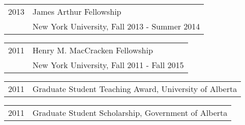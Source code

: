 \documentclass[letterpaper]{article}
\renewenvironment{itemize}{
  \begin{list}{}{
    \setlength{\leftmargin}{1.5em}
  }
}{
  \end{list}
}
\begin{document}
\begin{itemize}
\item \begin{tabular}{ll}
2013 & James Arthur Fellowship \\
& New York University, Fall 2013 - Summer 2014 \\
\end{tabular}

\item \begin{tabular}{ll}
2011 & Henry M. MacCracken Fellowship \\
& New York University, Fall 2011 - Fall 2015 \\
\end{tabular}

\item \begin{tabular}{ll}
2011 & Graduate Student Teaching Award, University of Alberta \\
\end{tabular}

\item \begin{tabular}{ll}
2011 & Graduate Student Scholarship, Government of Alberta \\
\end{tabular}

%
%
%
%
%
%
%
%


\end{itemize}
\end{document}
